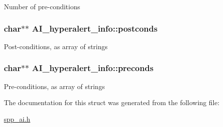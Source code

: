 Number of pre-\/conditions \hypertarget{structAI__hyperalert__info_a6a63385397bf814153d7bb20b52840d9}{
\subsubsection[{postconds}]{\setlength{\rightskip}{0pt plus 5cm}char$\ast$$\ast$ {\bf AI\_\-hyperalert\_\-info::postconds}}}
\label{structAI__hyperalert__info_a6a63385397bf814153d7bb20b52840d9}
Post-\/conditions, as array of strings \hypertarget{structAI__hyperalert__info_a8ac4e028c47a98a8be5afd4363164031}{
\subsubsection[{preconds}]{\setlength{\rightskip}{0pt plus 5cm}char$\ast$$\ast$ {\bf AI\_\-hyperalert\_\-info::preconds}}}
\label{structAI__hyperalert__info_a8ac4e028c47a98a8be5afd4363164031}
Pre-\/conditions, as array of strings 

The documentation for this struct was generated from the following file:\begin{DoxyCompactItemize}
\item 
\hyperlink{spp__ai_8h}{spp\_\-ai.h}\end{DoxyCompactItemize}
